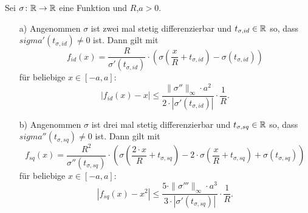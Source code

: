 \begin{lem}
  \label{lem:1}
  Sei $\sigma \colon \mathbb{R} \to \mathbb{R}$ eine Funktion und $R$,$a > 0$.
  \begin{itemize}
  \item[a)] Angenommen $\sigma$ ist zwei mal stetig differenzierbar und $t_{\sigma,id} \in \mathbb{R}$ so, dass $sigma'(t_{\sigma, id}) \neq 0$ ist. Dann gilt mit
  $$ f_{id}(x) = \frac{R}{\sigma'(t_{\sigma, id})} \cdot \left(\sigma\left(\frac{x}{R} + t_{\sigma, id}\right) - \sigma(t_{\sigma, id})\right)$$
  für beliebige $x \in [-a, a]\colon$ 
  $$ |f_{id}(x) - x| \leq \frac{\|\sigma''\|_{\infty} \cdot a^2}{2 \cdot |\sigma'(t_{\sigma, id})|} \cdot \frac{1}{R}.$$
  \item[b)] Angenommen $\sigma$ ist drei mal stetig differenzierbar und $t_{\sigma,sq} \in \mathbb{R}$ so, dass $sigma''(t_{\sigma, sq}) \neq 0$ ist. Dann gilt mit
  $$ f_{sq}(x) = \frac{R^2}{\sigma''(t_{\sigma, sq})} \cdot \left(\sigma\left(\frac{2 \cdot x}{R} + t_{\sigma, sq}\right) - 2 \cdot \sigma(\frac{x}{R} + t_{\sigma, sq})+ \sigma(t_{\sigma, sq})\right)$$
  für beliebige $x \in [-a, a]\colon$ 
  $$ |f_{sq}(x) - x^2| \leq \frac{5 \cdot \|\sigma'''\|_{\infty} \cdot a^3}{3 \cdot |\sigma'(t_{\sigma, sq})|} \cdot \frac{1}{R}.$$
  \end{itemize}
\end{lem}
